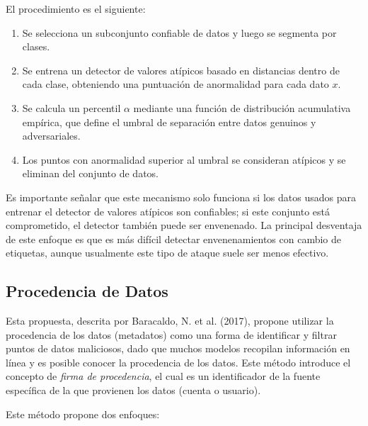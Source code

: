 \documentclass[letterpaper,12pt,oneside]{book}
\begin{document}
{{{{El procedimiento es el siguiente: 

\begin{enumerate}
    \item Se selecciona un subconjunto confiable de datos y luego se segmenta por clases.
    \item Se entrena un detector de valores atípicos basado en distancias dentro de cada clase, obteniendo una puntuación de anormalidad para cada dato $x$.
    \item Se calcula un percentil $\alpha$ mediante una función de distribución acumulativa empírica, que define el umbral de separación entre datos genuinos y adversariales.
    \item Los puntos con anormalidad superior al umbral se consideran atípicos y se eliminan del conjunto de datos.
\end{enumerate}

Es importante señalar que este mecanismo solo funciona si los datos usados para entrenar el detector de valores atípicos son confiables; si este conjunto está comprometido, el detector también puede ser envenenado. La principal desventaja de este enfoque es que es más difícil detectar envenenamientos con cambio de etiquetas, aunque usualmente este tipo de ataque suele ser menos efectivo.




\subsection{Procedencia de Datos}

Esta propuesta, descrita por Baracaldo, N. et al. (2017), propone utilizar la procedencia de los datos (metadatos) como una forma de identificar y filtrar puntos de datos maliciosos, dado que muchos modelos recopilan información en línea y es posible conocer la procedencia de los datos. Este método introduce el concepto de \textit{firma de procedencia}, el cual es un identificador de la fuente específica de la que provienen los datos (cuenta o usuario).    

Este método propone dos enfoques:

}}}}
\end{document}
